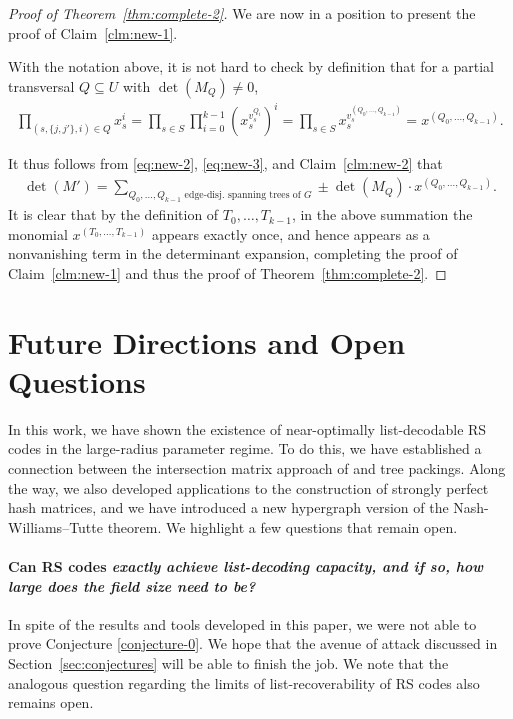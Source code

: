 \documentclass[11pt]{article}
\newcommand\black[1]{{\color{black} #1}}
\newcommand{\mkw}[1]{{\color{orange}{\small [Mary: #1]}}}
\begin{document}
\begin{proof}[Proof of Theorem~\ref{thm:complete-2}]
\vspace{5pt}

We are now in a position to present the proof of Claim~\ref{clm:new-1}.

\vspace{5pt}

 With the notation above, it is not hard to check by definition  that for a partial transversal $Q\subseteq U$ with $\det(M_Q)\neq 0$, \begin{align}\label{eq:new-3}
    \prod_{(s,\{j,j'\},i)\in Q}^{} x_s^i=\prod_{s\in S}\prod_{i=0}^{k-1} (x_s^{v_s^{Q_i}})^i=\prod_{s\in S} x_s^{v_s^{(Q_0,\ldots,Q_{k-1})}}=x^{(Q_0,\ldots,Q_{k-1})}.
\end{align}

It thus follows from \eqref{eq:new-2}, \eqref{eq:new-3}, and Claim~\ref{clm:new-2} that
\begin{align}
  \det(M')
  = \sum_{Q_0,\dots,Q_{k-1}\text{ edge-disj. spanning trees of $G$}}^{} \pm \det(M_{Q})\cdot x^{(Q_0,\dots,Q_{k-1})}.
\end{align}
It is clear that by the definition of $T_0,\ldots,T_{k-1}$,
in the above summation the monomial $x^{(T_0,\dots,T_{k-1})}$ appears exactly once, and hence appears as a nonvanishing term in the determinant expansion, completing the proof of Claim~\ref{clm:new-1} and thus the proof of Theorem~\ref{thm:complete-2}.
\end{proof}



\section{Future Directions and Open Questions}
In this work, we have shown the existence of near-optimally list-decodable RS codes in the large-radius parameter regime.  To do this, we have established a connection between the intersection matrix approach of \cite{shangguan2019combinatorial0} and tree packings.  Along the way, we also developed applications to the construction of strongly perfect hash matrices, and we have introduced a new hypergraph version of the Nash-Williams--Tutte theorem.
We highlight a few questions that remain open.

\paragraph{Can RS codes \em exactly \em achieve list-decoding capacity, \black{and if so, how large does the field size need to be?}}
In spite of the results and tools developed in this paper, we were not able to prove Conjecture \ref{conjecture-0}.
We hope that the avenue of attack discussed in Section~\ref{sec:conjectures} will be able to finish the job.
We note that the analogous question regarding the limits of  list-recoverability of RS codes also remains open.
\end{document}
